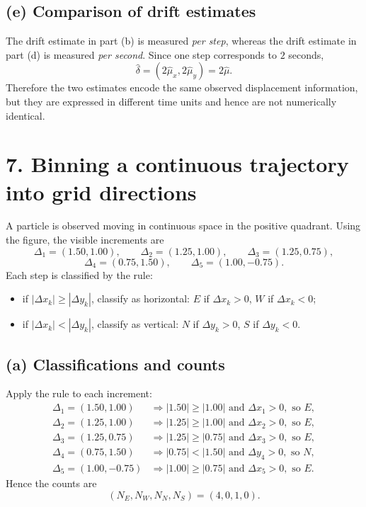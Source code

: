 \documentclass[11pt]{article}
\begin{document}
\subsection*{(e) Comparison of drift estimates}
The drift estimate in part (b) is measured \emph{per step}, whereas the drift estimate in part (d) is measured \emph{per second}. Since one step corresponds to $2$ seconds,
\[
\hat\delta=(2\hat\mu_x,2\hat\mu_y)=2\hat\mu.
\]
Therefore the two estimates encode the same observed displacement information, but they are expressed in different time units and hence are not numerically identical.

\newpage
\section*{7. Binning a continuous trajectory into grid directions}

A particle is observed moving in continuous space in the positive quadrant. Using the figure, the visible increments are
\[
\Delta_1=(1.50,1.00),\qquad
\Delta_2=(1.25,1.00),\qquad
\Delta_3=(1.25,0.75),
\]
\[
\Delta_4=(0.75,1.50),\qquad
\Delta_5=(1.00,-0.75).
\]
Each step is classified by the rule:
\begin{itemize}
\item if $|\Delta x_k|\ge |\Delta y_k|$, classify as horizontal: $E$ if $\Delta x_k>0$, $W$ if $\Delta x_k<0$;
\item if $|\Delta x_k|<|\Delta y_k|$, classify as vertical: $N$ if $\Delta y_k>0$, $S$ if $\Delta y_k<0$.
\end{itemize}

\subsection*{(a) Classifications and counts}
Apply the rule to each increment:
\begin{align*}
\Delta_1=(1.50,1.00)&\Rightarrow |1.50|\ge|1.00|\text{ and }\Delta x_1>0,\text{ so }E,\\
\Delta_2=(1.25,1.00)&\Rightarrow |1.25|\ge|1.00|\text{ and }\Delta x_2>0,\text{ so }E,\\
\Delta_3=(1.25,0.75)&\Rightarrow |1.25|\ge|0.75|\text{ and }\Delta x_3>0,\text{ so }E,\\
\Delta_4=(0.75,1.50)&\Rightarrow |0.75|<|1.50|\text{ and }\Delta y_4>0,\text{ so }N,\\
\Delta_5=(1.00,-0.75)&\Rightarrow |1.00|\ge|0.75|\text{ and }\Delta x_5>0,\text{ so }E.
\end{align*}
Hence the counts are
\[
(N_E,N_W,N_N,N_S)=(4,0,1,0).
\]
\end{document}
